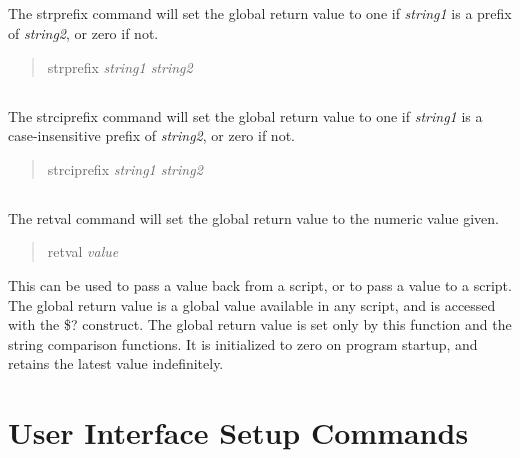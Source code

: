 \subsection{}


The {\cb strprefix} command will set the global return value to one if
{\it string1} is a prefix of {\it string2\/}, or zero if not.
\begin{quote}\vt
strprefix {\it string1 string2}
\end{quote}

\subsection{}


The {\cb strciprefix} command will set the global return value to one
if {\it string1} is a case-insensitive prefix of {\it string2\/}, or
zero if not.
\begin{quote}\vt
strciprefix {\it string1 string2}
\end{quote}

\subsection{}


The {\cb retval} command will set the global return value to the numeric
value given.
\begin{quote}\vt
retval {\it value}
\end{quote}
This can be used to pass a value back from a script, or to pass a
value to a script.  The global return value is a global value
available in any script, and is accessed with the {\vt \$?} construct. 
The global return value is set only by this function and the string
comparison functions.  It is initialized to zero on program startup,
and retains the latest value indefinitely.


\section{User Interface Setup Commands}

